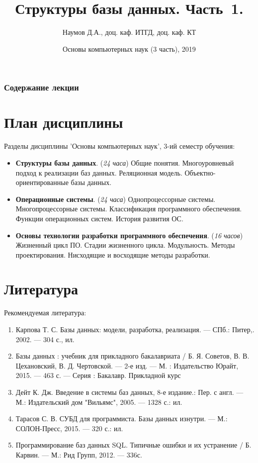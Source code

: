 \documentclass{beamer}
\title[СУБД]{Структуры базы данных. Часть~1. }
\author{Наумов Д.А., доц. каф. ИТГД, доц. каф. КТ}
\date[15.02.2019] {Основы компьютерных наук (3 часть), 2019}
\begin{document}
\begin{frame}
  \titlepage
\end{frame}
  
\begin{frame}
  \frametitle{Содержание лекции}
  \tableofcontents  
\end{frame}
  
\section{План дисциплины}
\begin{frame}
Разделы дисциплины 'Основы компьютерных наук', 3-ий семестр обучения:
\begin{itemize}
\item \textbf{Структуры базы данных}. (\textit{24 часа}) Общие понятия. Многоуровневый подход к реализации баз данных. Реляционная модель. Объектно-ориентированные базы данных. 
\item \textbf{Операционные системы}. (\textit{24 часа}) Однопроцессорные системы. Многопроцессорные системы. Классификация программного обеспечения. Функции операционных систем. История развития ОС.
\item \textbf{Основы технологии разработки программного обеспечения}. (\textit{16 часов}) Жизненный цикл ПО. Стадии жизненного цикла. Модульность. Методы проектирования. Нисходящие и восходящие методы разработки.
\end{itemize}
\end{frame} 
  
\section*{Литература}
\begin{frame}   
Рекомендуемая литература:
\begin{enumerate}
\item Карпова Т. С. Базы данных: модели, разработка, реализация. — СПб.: Питер,. 2002. — 304 с., ил.
\item Базы данных : учебник для прикладного бакалавриата / Б. Я. Советов, В. В. Цехановский, В. Д. Чертовской. — 2-е изд. — М. : Издательство Юрайт, 2015. — 463 с. — Серия : Бакалавр. Прикладной курс
\item Дейт К. Дж. Введение в системы баз данных, 8-е издание.: Пер. с англ. — М.: Издательский дом "Вильямс", 2005. — 1328 с.: ил.
\item Тарасов С. В. СУБД для программиста. Базы данных изнутри. — М.: СОЛОН-Пресс, 2015. — 320 с.: ил.
\item Программирование  баз  данных  SQL.  Типичные  ошибки  и  их устранение  /  Б.  Карвин.  —  М.:  Рид  Групп,  2012.  — 336с. 
\end{enumerate}
\end{frame}   
\end{document}
